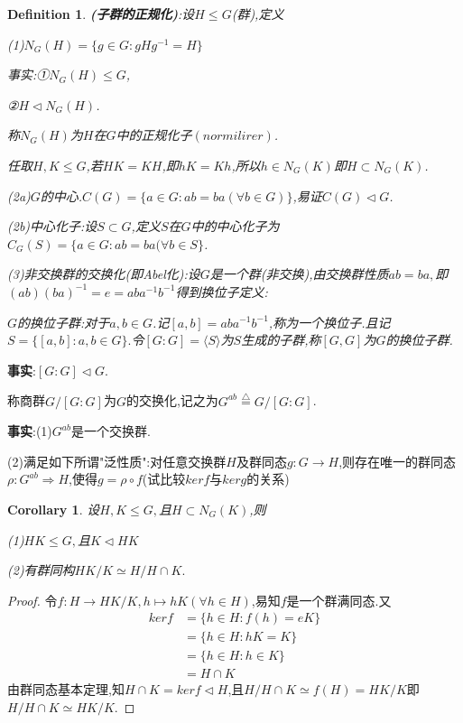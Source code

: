 \documentclass[UTF8]{article}
\newtheorem{defn}{Definition}[section]
\newtheorem{cor}{Corollary}[section]
\begin{document}
\begin{defn}
	\textbf{(子群的正规化)}:设$H\le G$(群),定义
	
	(1)$N_G(H)=\{g\in G:gHg^{-1}=H\}$
	
	事实:①$N_G(H)\le G$,
	
	\quad ②$H\triangleleft N_G(H)$.
	
	称$N_G(H)$为$H$在$G$中的正规化子$(normilirer)$.
	
	任取$H,K\le G$,若$HK=KH$,即$hK=Kh$,所以$h\in  N_G(K)$即$H\subset N_G(K)$.
	
	(2a)$G$的中心.$C(G)=\{a\in G:ab=ba(\forall b\in G)\}$,易证$C(G)\triangleleft G$.
	
	(2b)中心化子:设$S\subset G$,定义$S$在$G$中的中心化子为$C_G(S)=\{a\in G:ab=ba(\forall b\in S\}$.
	
	(3)非交换群的交换化(即Abel化):设$G$是一个群(非交换),由交换群性质$ab=ba,$即$(ab)(ba)^{-1}=e=aba^{-1}b^{-1}$得到换位子定义:
	
	$G$的换位子群:对于$a,b\in G$.记$[a,b]=aba^{-1}b^{-1}$,称为一个换位子.且记$S=\{[a,b]:a,b\in G\}.$令$[G:G]=\langle S\rangle$为$S$生成的子群,称$[G,G]$为$G$的换位子群.
\end{defn}

\textbf{事实}:$[G:G]\triangleleft G.$

称商群$G/[G:G]$为$G$的交换化,记之为$G^{ab}\stackrel{\bigtriangleup}{=}G/[G:G]$.

\textbf{事实}:(1)$G^{ab}$是一个交换群.

\quad(2)满足如下所谓"泛性质":对任意交换群$H$及群同态$g:G\to H$,则存在唯一的群同态$\rho:G^{ab}\Rightarrow H$,使得$g=\rho\circ f$(试比较$kerf$与$kerg$的关系)

\begin{cor}
	设$H,K\le G,$且$H\subset N_G(K)$,则
	
	(1)$HK\le G,$且$K\triangleleft HK$
	
	(2)有群同构$HK/K\simeq H/H\cap K.$
\end{cor}

\begin{proof}
	令$f:H\to HK/K,h\mapsto hK(\forall h\in H)$,易知$f$是一个群满同态.又
	\[
	\begin{split}
	kerf&=\{h\in H:f(h)=eK\}\\
	&=\{h\in H:hK=K\}\\
	&=\{h\in H:h\in K\}\\
	&=H\cap K
	\end{split}
	\]
	由群同态基本定理,知$H\cap K=kerf\triangleleft H$,且$H/H\cap K\simeq f(H)=HK/K$即$H/H\cap K\simeq HK/K$.
\end{proof}
\end{document}
